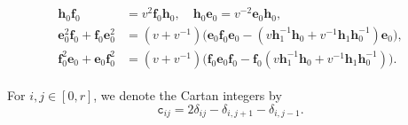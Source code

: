 \documentclass[12pt,reqno]{amsart}
\numberwithin{equation}{section}
\theoremstyle{definition}
\theoremstyle{plain}
\begin{document}
\begin{align}
\label{i=0}
\begin{split}
\mathbf{h}_0  \mathbf f_0 & = v^{2} \mathbf  f_0 \mathbf{h}_0, \quad
 \mathbf{h}_0  \mathbf e_0  = v^{-2} \mathbf  e_0 \mathbf{h}_0,  \\ 
\mathbf e_0^2 \mathbf f_0 + \mathbf f_0 \mathbf e^2_0
& = (v + v^{-1}) \big(\mathbf  e_0 \mathbf f_0 \mathbf e_0 - ( v\mathbf {h}_1^{-1} \mathbf{h}_0  + v^{-1}\mathbf{h}_1 \mathbf{h}_0^{-1} ) \mathbf  e_0 \big), 
\\
\mathbf f_0^2 \mathbf  e_0 + \mathbf e_0 \mathbf f_0^2
& = (v + v^{-1})  \big(\mathbf f_0\mathbf  e_0 \mathbf f_0 - \mathbf  f_0 (v\mathbf{h}_1^{-1}\mathbf{h}_0 + v^{-1}\mathbf{h}_1 \mathbf{h}_0^{-1}) \big).  
\end{split}
\end{align}

For $i, j \in [0, r]$, we denote the Cartan integers by
\begin{equation} 
  \label{aij}
  \texttt{c}_{ij} = 2 \delta_{ij} - \delta_{i, j+1} - \delta_{i, j-1}.
\end{equation} 
\end{document}
